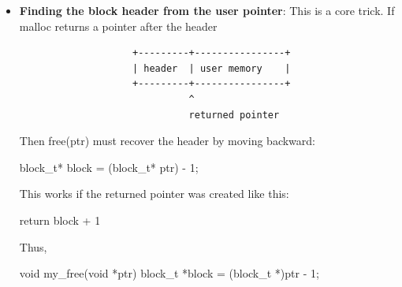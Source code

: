 \documentclass{report}
\begin{document}
\begin{itemize}
\begin{enumerate}
                        \bigbreak \noindent 
                        In this model, when a block is allocated, it is removed from the free list.
                        \bigbreak \noindent 
                        When a block is freed, it is inserted into the free list
                        \bigbreak \noindent 
                        But usually there is not also a normal “in-use list” for allocated blocks. The allocator does not need one for ordinary operation. When the user calls 
                        \bigbreak \noindent 
                        \begin{cppcode}
                        free(ptr)
                        \end{cppcode}
                        \bigbreak \noindent 
                        The allocator can find the block header directly
                        \bigbreak \noindent 
                        \begin{cppcode}
                        block_t* block = (block_t*)ptr-1;
                        \end{cppcode}
                \end{enumerate}
            \item \textbf{Finding the block header from the user pointer}: This is a core trick. If malloc returns a pointer after the header
                \begin{verbatim}
                    +---------+----------------+
                    | header  | user memory    |
                    +---------+----------------+
                              ^
                              returned pointer
                \end{verbatim}
                Then free(ptr) must recover the header by moving backward:
                \bigbreak \noindent 
                \begin{cppcode}
                block_t* block = (block_t* ptr) - 1;
                \end{cppcode}
                \bigbreak \noindent 
                This works if the returned pointer was created like this:
                \bigbreak \noindent 
                \begin{cppcode}
                return block + 1
                \end{cppcode}
                \bigbreak \noindent 
                Thus,
                \bigbreak \noindent 
                \begin{cppcode}
                    void my_free(void *ptr) {
                        block_t *block = (block_t *)ptr - 1;
}
\end{cppcode}
\end{itemize}
\end{document}
